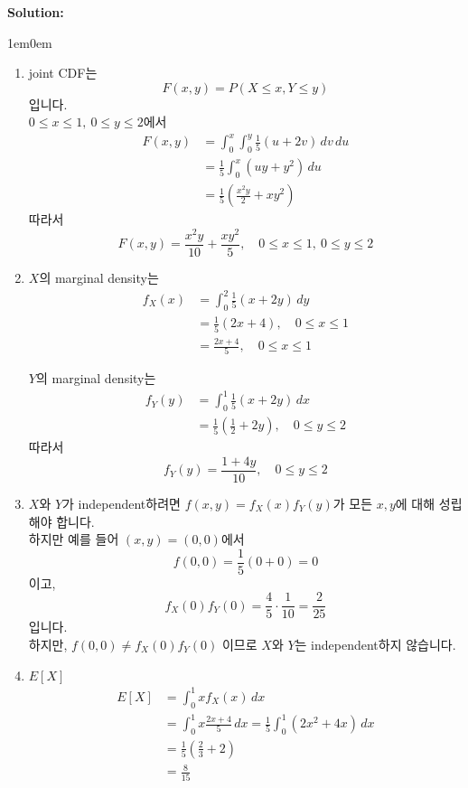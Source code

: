 \documentclass{article}
\newenvironment{solution}
{
    \par\medskip
    \noindent\textbf{Solution:}
    \begin{adjustwidth}{1em}{0em}
}
{
    \end{adjustwidth}
    \medskip
}
\begin{document}
\begin{enumerate}[label=\textbf{\arabic*.}, leftmargin=*]
\begin{solution}
\begin{enumerate}[label=(\alph*), leftmargin=2em, itemsep=1em]
            \item joint CDF는  
            $$  
            F(x,y)=P(X\le x,Y\le y)  
            $$  
            입니다.  \\
            $0\le x\le 1,\ 0\le y\le 2$에서  
            \begin{align*}
                F(x,y)&=\int_0^x\int_0^y \frac15(u+2v)\,dv\,du  \\
                &=\frac15\int_0^x(uy+y^2)\,du  \\
                &=\frac15\left(\frac{x^2y}{2}+xy^2\right)  
            \end{align*} 
            따라서  
            $$  
            F(x,y)=\frac{x^2y}{10}+\frac{xy^2}{5},\quad 0\le x\le 1,\ 0\le y\le 2  
            $$  

            \item $X$의 marginal density는  
            \begin{align*}
                f_X(x)&=\int_0^2 \frac15(x+2y)\,dy\\
                &=\frac15(2x+4),\quad 0\le x\le 1 \\
                &=\frac{2x+4}{5},\quad 0\le x\le 1
            \end{align*} 
          
            $Y$의 marginal density는  
            \begin{align*}
                f_Y(y)&=\int_0^1 \frac15(x+2y)\,dx  \\
                &=\frac15\left(\frac12+2y\right),\quad 0\le y\le 2  
            \end{align*} 
            따라서  
            $$  
            f_Y(y)=\frac{1+4y}{10},\quad 0\le y\le 2  
            $$

            \item $X$와 $Y$가 independent하려면 $f(x,y)=f_X(x)f_Y(y)$가 모든 $x,y$에 대해 성립해야 합니다.  \\
            하지만 예를 들어 $(x,y)=(0,0)$에서  
            $$  
            f(0,0)=\frac15(0+0)=0  
            $$  
            이고,  
            $$  
            f_X(0)f_Y(0)=\frac45\cdot\frac1{10}=\frac{2}{25}  
            $$  
            입니다.  \\
            하지만, $f(0,0)\ne f_X(0)f_Y(0)$ 이므로 $X$와 $Y$는 independent하지 않습니다.  

            \item  $E[X]$  
            \begin{align*}
                E[X]&=\int_0^1 x f_X(x)\,dx \\
                &=\int_0^1 x\frac{2x+4}{5}\,dx=\frac15\int_0^1(2x^2+4x)\,dx\\
                &=\frac15\left(\frac23+2\right)\\
                &=\frac{8}{15}
            \end{align*}
  

\end{enumerate}
\end{solution}
\end{enumerate}
\end{document}
